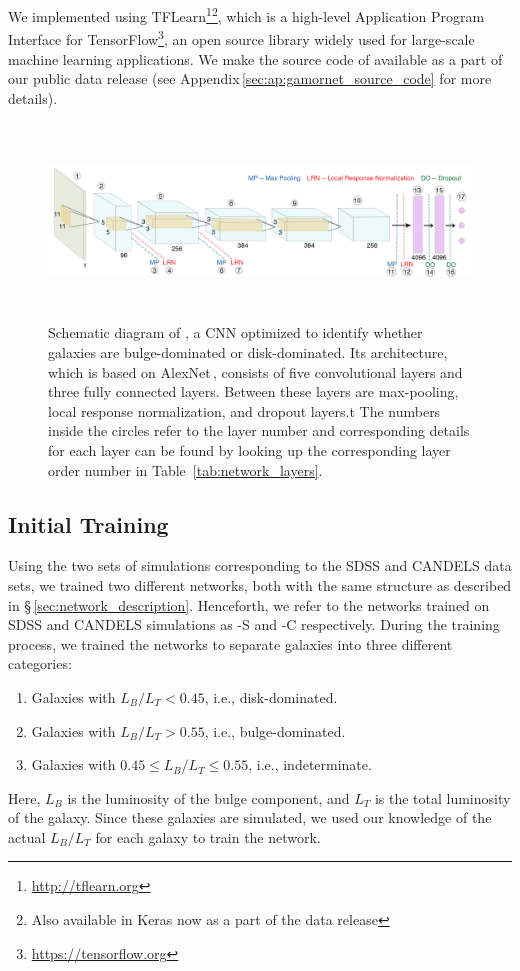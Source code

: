 We implemented \gamornet{} using TFLearn\footnote{\href{http://tflearn.org}{http://tflearn.org}}\footnote{Also available in Keras now as a part of the data release}, which is a high-level Application Program Interface for TensorFlow\footnote{\href{https://tensorflow.org}{https://tensorflow.org}}, an open source library widely used for large-scale machine learning applications. We make the source code of \gamornet{} available as a part of our public data release (see Appendix\,\ref{sec:ap:gamornet_source_code} for more details).

\begin{figure}[htb]
    \centering
    \includegraphics[width = \textwidth, height= 5.2cm]{galmnet_schematic_coloured.pdf}
    \caption{Schematic diagram of \gamornet{}, a CNN optimized to identify whether galaxies are bulge-dominated or disk-dominated. Its architecture, which is based on AlexNet\,\citep{alexnet}, consists of five convolutional layers and three fully connected layers. Between these layers are max-pooling, local response normalization, and dropout layers.t The numbers inside the circles refer to the layer number and corresponding details for each layer can be found by looking up the corresponding layer order number in Table~\ref{tab:network_layers}. }
    \label{fig:galmnet_schematic}
\end{figure}

\subsection{Initial Training} \label{sec:initial_training}
 Using the two sets of simulations corresponding to the SDSS and CANDELS data sets, we trained two different networks, both with the same structure as described in \S\,\ref{sec:network_description}. Henceforth, we refer to the networks trained on SDSS and CANDELS simulations as \gamornet{}-S and \gamornet{}-C respectively. During the training process, we trained the networks to separate galaxies into three different categories:
\begin{enumerate}[noitemsep]
\item Galaxies with $L_B/L_T < 0.45 $, i.e., disk-dominated.
\item Galaxies with $L_B/L_T > 0.55 $, i.e., bulge-dominated.
\item Galaxies with $ 0.45 \leq L_B/L_T \leq 0.55 $, i.e., indeterminate.
\end{enumerate}
Here, $L_B$ is the luminosity of the bulge component, and $L_T$ is the total luminosity of the galaxy. Since these galaxies are simulated, we used our knowledge of the actual $L_B/L_T$ for each galaxy to train the network.

